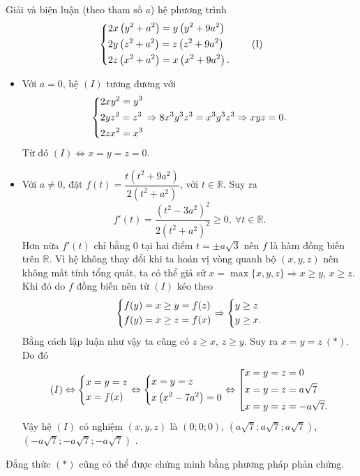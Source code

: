 \begin{bt}%
	Giải và biện luận (theo tham số $a$) hệ phương trình 
	\[\left\{\begin{aligned}&2x\left(y^2+a^2\right)=y\left(y^2+9a^2\right)\\
				&2y\left(z^2+a^2\right)=z\left(z^2+9a^2\right)\\
				&2z\left(x^2+a^2\right)=x\left(x^2+9a^2\right).\end{aligned}\right.\tag{I}\]
\loigiai
{
\begin{itemize}
	\item Với $a=0$, hệ $(I)$ tương đương với
	\[\left\{\begin{aligned}&2xy^2=y^3\\ &2yz^2=z^3\\ &2zx^2=x^3\end{aligned}\right.\Rightarrow 8x^3y^3z^3=x^3y^3z^3\Rightarrow xyz=0.\]
	Từ đó $(I)\Leftrightarrow x=y=z=0$.
	\item Với $a\neq 0$, đặt $f(t)=\dfrac{t\left(t^2+9a^2\right)}{2\left(t^2+a^2\right)}$, với $t\in\mathbb{R}$. Suy ra 
	\[f'(t)=\dfrac{\left(t^2-3a^2\right)^2}{2\left(t^2+a^2\right)^2}\ge 0,\ \forall t\in\mathbb{R}.\]
	Hơn nữa $f'(t)$ chỉ bằng $0$ tại hai điểm $t=\pm a\sqrt 3$ nên $f$ là hàm đồng biến trên $\mathbb{R}$. Vì hệ không thay đổi khi ta hoán vị vòng quanh bộ $(x,y,z)$ nên không mất tính tổng quát, ta có thể giả sử $x=\max\{x,y,z\}\Rightarrow x\ge y$, $x\ge z$. Khi đó do $f$ đồng biến nên từ $(I)$ kéo theo
	\[\left\{\begin{aligned}&f(y)=x\ge y=f(z)\\ &f(y)=x\ge z=f(x)\end{aligned}\right.\Rightarrow \left\{\begin{aligned}&y\ge z\\ &y\ge x.\end{aligned}\right.\]
	Bằng cách lập luận như vậy ta cũng có $z\ge x$, $z\ge y$. Suy ra $x=y=z\ (*)$. Do đó
	\[(I)\Leftrightarrow \left\{\begin{aligned}&x=y=z\\ &x=f(x)\end{aligned}\right.\Leftrightarrow \left\{\begin{aligned}&x=y=z\\ &x\left(x^2-7a^2\right)=0\end{aligned}\right.\Leftrightarrow \left[\begin{aligned}&x=y=z=0\\ &x=y=z=a\sqrt 7\\ &x=y=z=-a\sqrt 7.\end{aligned}\right.\]
	Vậy hệ $(I)$ có nghiệm $(x,y,z)$ là $(0;0;0)$, $\left(a\sqrt 7; a\sqrt 7; a\sqrt 7\right)$, $\left(-a\sqrt 7; -a\sqrt 7; -a\sqrt 7\right)$ .
\end{itemize}	
\begin{nx}
	Đẳng thức $(*)$ cũng có thể được chứng minh bằng phương pháp phản chứng.
\end{nx}
}	
\end{bt}

